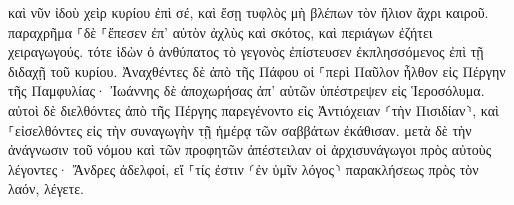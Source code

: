 \documentclass{openreader}
\begin{document}
καὶ νῦν ἰδοὺ χεὶρ κυρίου ἐπὶ σέ, καὶ ἔσῃ τυφλὸς μὴ βλέπων τὸν ἥλιον ἄχρι καιροῦ. παραχρῆμα ⸀δὲ ⸀ἔπεσεν ἐπ’ αὐτὸν ἀχλὺς καὶ σκότος, καὶ περιάγων ἐζήτει χειραγωγούς. 
τότε ἰδὼν ὁ ἀνθύπατος τὸ γεγονὸς ἐπίστευσεν ἐκπλησσόμενος ἐπὶ τῇ διδαχῇ τοῦ κυρίου. 
Ἀναχθέντες δὲ ἀπὸ τῆς Πάφου οἱ ⸀περὶ Παῦλον ἦλθον εἰς Πέργην τῆς Παμφυλίας· Ἰωάννης δὲ ἀποχωρήσας ἀπ’ αὐτῶν ὑπέστρεψεν εἰς Ἱεροσόλυμα. 
αὐτοὶ δὲ διελθόντες ἀπὸ τῆς Πέργης παρεγένοντο εἰς Ἀντιόχειαν ⸂τὴν Πισιδίαν⸃, καὶ ⸀εἰσελθόντες εἰς τὴν συναγωγὴν τῇ ἡμέρᾳ τῶν σαββάτων ἐκάθισαν. 
μετὰ δὲ τὴν ἀνάγνωσιν τοῦ νόμου καὶ τῶν προφητῶν ἀπέστειλαν οἱ ἀρχισυνάγωγοι πρὸς αὐτοὺς λέγοντες· Ἄνδρες ἀδελφοί, εἴ ⸀τίς ἐστιν ⸂ἐν ὑμῖν λόγος⸃ παρακλήσεως πρὸς τὸν λαόν, λέγετε. 
\end{document}
